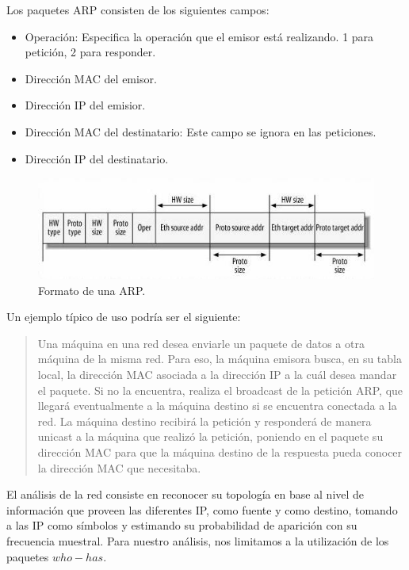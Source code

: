 \documentclass[10pt, a4paper]{article}
\begin{document}
Los paquetes ARP consisten de los siguientes campos:
\begin{itemize}
\item Operación: Especifica la operación que el emisor está realizando. 1 para petición, 2 para responder.
\item Dirección MAC del emisor.
\item Dirección IP del emisior.
\item Dirección MAC del destinatario: Este campo se ignora en las peticiones.
\item Dirección IP del destinatario.
\end{itemize}
\begin{figure}[H] %
\begin{center}
\includegraphics[width=350pt]{../imgs/arp.jpg}
\caption{Formato de una ARP.}
\end{center}
\end{figure}

Un ejemplo típico de uso podría ser el siguiente:

\begin{quotation}
Una máquina en una red desea enviarle un paquete de datos a otra máquina de la misma red. Para eso, la máquina emisora busca, en su tabla local, la dirección MAC asociada a la dirección IP a la cuál desea mandar el paquete. Si no la encuentra, realiza el broadcast de la petición ARP, que llegará eventualmente a la máquina destino si se encuentra conectada a la red. 
La máquina destino recibirá la petición y responderá de manera unicast a la máquina que realizó la petición, poniendo en el paquete su dirección MAC para que la máquina destino de la respuesta pueda conocer la dirección MAC que necesitaba.
\end{quotation}

El análisis de la red consiste en reconocer su topología en base al nivel de información que proveen las diferentes IP, como fuente y como destino, tomando a las IP como símbolos y estimando su probabilidad de aparición con su frecuencia muestral. Para nuestro análisis, nos limitamos a la utilización de los paquetes $who-has$.
\end{document}
